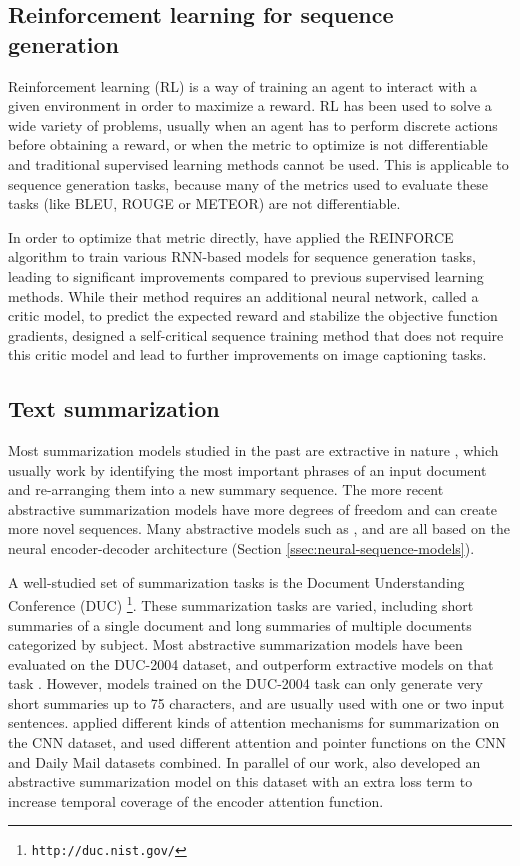 \documentclass{article} \usepackage{iclr2018_arxiv,times}
\begin{document}
\subsection{Reinforcement learning for sequence generation}


Reinforcement learning (RL) is a way of training an agent to interact with a given environment in order to maximize a reward. RL has been used to solve a wide variety of problems, usually when an agent has to perform discrete actions before obtaining a reward, or when the metric to optimize is not differentiable and traditional supervised learning methods cannot be used. This is applicable to sequence generation tasks, because many of the metrics used to evaluate these tasks (like BLEU, ROUGE or METEOR) are not differentiable.


In order to optimize that metric directly, \citet{ranzato2015} have applied the REINFORCE algorithm \citep{williams1992} to train various RNN-based models for sequence generation tasks, leading to significant improvements compared to previous supervised learning methods. While their method requires an additional neural network, called a critic model, to predict the expected reward and stabilize the objective function gradients, \citet{rennie2016} designed a self-critical sequence training method that does not require this critic model and lead to further improvements on image captioning tasks.

\subsection{Text summarization}

Most summarization models studied in the past are extractive in nature \citep{dorr2003,nallapati2017,durrett2016learning}, which usually work by identifying the most important phrases of an input document and re-arranging them into a new summary sequence. The more recent abstractive summarization models have more degrees of freedom and can create more novel sequences. Many abstractive models such as \citet{rush2015}, \citet{chopra2016} and \citet{nallapati2016} are all based on the neural encoder-decoder architecture (Section \ref{ssec:neural-sequence-models}).

A well-studied set of summarization tasks is the Document Understanding Conference (DUC) \footnote{\tt http://duc.nist.gov/}. These summarization tasks are varied, including short summaries of a single document and long summaries of multiple documents categorized by subject. Most abstractive summarization models have been evaluated on the DUC-2004 dataset, and outperform extractive models on that task \citep{dorr2003}. However, models trained on the DUC-2004 task can only generate very short summaries up to 75 characters, and are usually used with one or two input sentences. \citet{chen2016distraction} applied different kinds of attention mechanisms for summarization on the CNN dataset, and \citet{nallapati2016} used different attention and pointer functions on the CNN and Daily Mail datasets combined. In parallel of our work, \citet{see2017} also developed an abstractive summarization model on this dataset with an extra loss term to increase temporal coverage of the encoder attention function.
\end{document}
